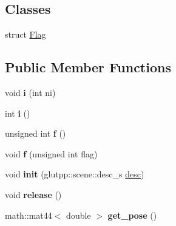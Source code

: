 \subsection*{\-Classes}
\begin{DoxyCompactItemize}
\item 
struct \hyperlink{structglutpp_1_1scene_1_1scene_1_1Flag}{\-Flag}
\end{DoxyCompactItemize}
\subsection*{\-Public \-Member \-Functions}
\begin{DoxyCompactItemize}
\item 
\hypertarget{classglutpp_1_1scene_1_1scene_abe1fa6d1512bfd84e91f9192e7c743ca}{void {\bfseries i} (int ni)}\label{classglutpp_1_1scene_1_1scene_abe1fa6d1512bfd84e91f9192e7c743ca}

\item 
\hypertarget{classglutpp_1_1scene_1_1scene_abbc88704970f055844e5f06453178dcb}{int {\bfseries i} ()}\label{classglutpp_1_1scene_1_1scene_abbc88704970f055844e5f06453178dcb}

\item 
\hypertarget{classglutpp_1_1scene_1_1scene_acb8ef22577d6d70aef89faf02c671d77}{unsigned int {\bfseries f} ()}\label{classglutpp_1_1scene_1_1scene_acb8ef22577d6d70aef89faf02c671d77}

\item 
\hypertarget{classglutpp_1_1scene_1_1scene_a25b3ffec412aa55a88d4c4fb6a1c7a3b}{void {\bfseries f} (unsigned int flag)}\label{classglutpp_1_1scene_1_1scene_a25b3ffec412aa55a88d4c4fb6a1c7a3b}

\item 
\hypertarget{classglutpp_1_1scene_1_1scene_ac204eb31618e2fd30c962c49e3767e25}{void {\bfseries init} (glutpp\-::scene\-::desc\-\_\-s \hyperlink{classglutpp_1_1scene_1_1desc}{desc})}\label{classglutpp_1_1scene_1_1scene_ac204eb31618e2fd30c962c49e3767e25}

\item 
\hypertarget{classglutpp_1_1scene_1_1scene_a5de02f6d7763af6ad7b5fb8e57499a65}{void {\bfseries release} ()}\label{classglutpp_1_1scene_1_1scene_a5de02f6d7763af6ad7b5fb8e57499a65}

\item 
\hypertarget{classglutpp_1_1scene_1_1scene_ab60b4329ae765b2fe64e0cfc08a406a8}{math\-::mat44$<$ double $>$ {\bfseries get\-\_\-pose} ()}\label{classglutpp_1_1scene_1_1scene_ab60b4329ae765b2fe64e0cfc08a406a8}


\end{DoxyCompactItemize}
